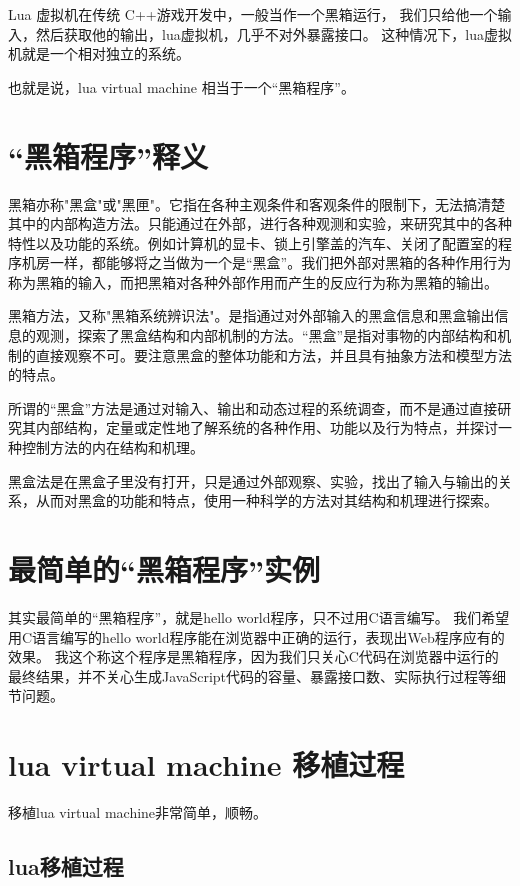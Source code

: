 Lua 虚拟机在传统 C++游戏开发中，一般当作一个黑箱运行，
我们只给他一个输入，然后获取他的输出，lua虚拟机，几乎不对外暴露接口。
这种情况下，lua虚拟机就是一个相对独立的系统。

也就是说，lua virtual machine 相当于一个“黑箱程序”。

\section{“黑箱程序”释义}

黑箱亦称"黑盒"或"黑匣"。它指在各种主观条件和客观条件的限制下，无法搞清楚其中的内部构造方法。只能通过在外部，进行各种观测和实验，来研究其中的各种特性以及功能的系统。例如计算机的显卡、锁上引擎盖的汽车、关闭了配置室的程序机房一样，都能够将之当做为一个是“黑盒”。我们把外部对黑箱的各种作用行为称为黑箱的输入，而把黑箱对各种外部作用而产生的反应行为称为黑箱的输出。

黑箱方法，又称"黑箱系统辨识法"。是指通过对外部输入的黑盒信息和黑盒输出信息的观测，探索了黑盒结构和内部机制的方法。“黑盒”是指对事物的内部结构和机制的直接观察不可。要注意黑盒的整体功能和方法，并且具有抽象方法和模型方法的特点。

所谓的“黑盒”方法是通过对输入、输出和动态过程的系统调查，而不是通过直接研究其内部结构，定量或定性地了解系统的各种作用、功能以及行为特点，并探讨一种控制方法的内在结构和机理。

黑盒法是在黑盒子里没有打开，只是通过外部观察、实验，找出了输入与输出的关系，从而对黑盒的功能和特点，使用一种科学的方法对其结构和机理进行探索。


\section{最简单的“黑箱程序”实例}

其实最简单的“黑箱程序”，就是hello world程序，只不过用C语言编写。
我们希望用C语言编写的hello world程序能在浏览器中正确的运行，表现出Web程序应有的效果。
我这个称这个程序是黑箱程序，因为我们只关心C代码在浏览器中运行的最终结果，并不关心生成JavaScript代码的容量、暴露接口数、实际执行过程等细节问题。

\section{lua virtual machine 移植过程}

移植lua virtual machine非常简单，顺畅。

\subsection{lua移植过程}

